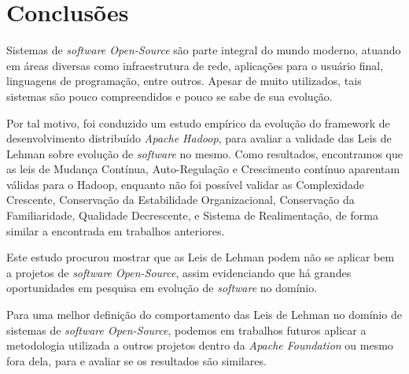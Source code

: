 \chapter{Conclusões}
\label{chapter:conclusion}
Sistemas de \textit{software Open-Source} são parte integral do mundo moderno, atuando em áreas diversas como infraestrutura de rede, aplicações para o usuário final, linguagens de programação, entre outros. Apesar de muito utilizados, tais sistemas são pouco compreendidos e pouco se sabe de sua evolução.

Por tal motivo, foi conduzido um estudo empírico da evolução do framework de desenvolvimento distribuído \textit{Apache Hadoop}, para avaliar a validade das Leis de Lehman sobre evolução de \textit{software} no mesmo. Como resultados, encontramos que as leis de Mudança Contínua, Auto-Regulação e Crescimento contínuo aparentam válidas para o Hadoop, enquanto não foi possível validar as Complexidade Crescente, Conservação da Estabilidade Organizacional, Conservação da Familiaridade, Qualidade Decrescente, e Sistema de Realimentação, de forma similar a encontrada em trabalhos anteriores\cite{neamtiu2013towards,israeli2010linux,skoulis2014open}. 

Este estudo procurou mostrar que as Leis de Lehman podem não se aplicar bem a projetos de \textit{software Open-Source}, assim evidenciando que há grandes oportunidades em pesquisa em evolução de \textit{software} no domínio. 

Para uma melhor definição do comportamento das Leis de Lehman no domínio de sistemas de \textit{software Open-Source}, podemos em trabalhos futuros aplicar a metodologia utilizada a outros projetos dentro da \textit{Apache Foundation} ou mesmo fora dela, para e avaliar se os resultados são similares.